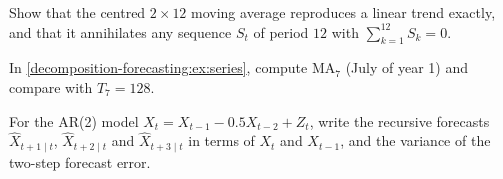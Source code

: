 \begin{notechapter}
\begin{exercise}\label{decomposition-forecasting:exr:1}
Show that the centred $2\times12$ moving average reproduces a linear trend exactly, and that it
annihilates any sequence $S_t$ of period $12$ with $\sum_{k=1}^{12}S_k = 0$.
\end{exercise}

\begin{exercise}\label{decomposition-forecasting:exr:2}
In \cref{decomposition-forecasting:ex:series}, compute $\mathrm{MA}_7$ (July of year 1) and compare with $T_7 = 128$.
\end{exercise}

\begin{exercise}\label{decomposition-forecasting:exr:3}
For the AR(2) model $X_t = X_{t-1} - 0.5X_{t-2} + Z_t$, write the recursive forecasts $\hat X_{t+1\mid t}$, $\hat X_{t+2\mid t}$ and
$\hat X_{t+3\mid t}$ in terms of $X_t$ and $X_{t-1}$, and the variance of the two-step forecast error.
\end{exercise}
\end{notechapter}
